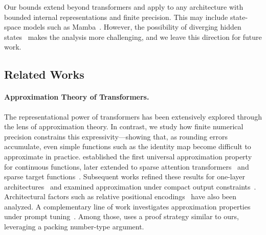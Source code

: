 \begin{remark}\label{rmk:mamba}
    Our bounds extend beyond transformers and apply to any architecture with bounded internal representations and finite precision. This may include state-space models such as Mamba~\citep{gu2024mamba}. However, the possibility of diverging hidden states~\citep{lu2026mamba} makes the analysis more challenging, and we leave this direction for future work.
\end{remark}

\subsection{Related Works}

\paragraph{Approximation Theory of Transformers.}
The representational power of transformers has been extensively explored through the lens of approximation theory. In contrast, we study how finite numerical precision constrains this expressivity—showing that, as rounding errors accumulate, even simple functions such as the identity map become difficult to approximate in practice. \citet{Yun_C_2020_p-iclr_continuous} established the first universal approximation property for continuous functions, later extended to sparse attention transformers~\citep{a8b4c6da7b064322905cf50d4103d356} and sparse target functions~\citep{edelman2022inductive}. Subsequent works refined these results for one-layer architectures~\citep{kajitsuka2024are, Jiang_H_2024_p_nips_Jackson-type} and examined approximation under compact output constraints~\citep{kratsios2022universal}. Architectural factors such as relative positional encodings~\citep{luo2022your} have also been analyzed. A complementary line of work investigates approximation properties under prompt tuning~\citep{Wang_Y_2023_p-nips_prompt-og, Hu_J_2025_p-iclr_prompt-smaller}. Among those, \citet{meyer2025memorylimitationsprompttuning} uses a proof strategy similar to ours, leveraging a packing number-type argument.


